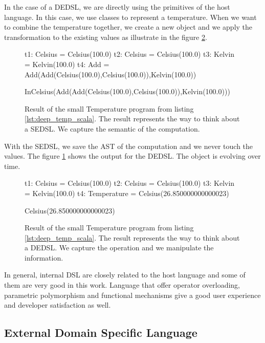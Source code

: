 In the case of a \gls{DEDSL}, we are directly using the primitives of the host
language. In this case, we use classes to represent a temperature. When we want
to combine the temperature together, we create a new object and we apply the
transformation to the existing values as illustrate in the figure \ref{fig:dsl_deep_result}.

\begin{figure}[ht]
  \centering
  \begin{scalacode}
t1: Celsius = Celsius(100.0)
t2: Celsius = Celsius(100.0)
t3: Kelvin = Kelvin(100.0)
t4: Add = Add(Add(Celsius(100.0),Celsius(100.0)),Kelvin(100.0))

InCelsius(Add(Add(Celsius(100.0),Celsius(100.0)),Kelvin(100.0)))
  \end{scalacode}
  \caption[Result of the \gls{SEDSL} for Temperature]{Result of the small
    Temperature program from listing \ref{lst:deep_temp_scala}. The result
    represents the way to think about a \gls{SEDSL}. We capture the semantic of
    the computation.}
  \label{fig:dsl_shallow_result}
\end{figure}

With the \gls{SEDSL}, we save the \gls{AST} of the computation and we never
touch the values. The figure \ref{fig:dsl_shallow_result} shows the output for
the \gls{DEDSL}. The object is evolving over time.

\begin{figure}[ht]
  \centering
  \begin{scalacode}
t1: Celsius = Celsius(100.0)
t2: Celsius = Celsius(100.0)
t3: Kelvin = Kelvin(100.0)
t4: Temperature = Celsius(26.850000000000023)

Celsius(26.850000000000023)
  \end{scalacode}
  \caption[Result of the \gls{DEDSL} for Temperature]{Result of the small
    Temperature program from listing \ref{lst:deep_temp_scala}. The result
    represents the way to think about a \gls{DEDSL}. We capture the operation and
  we manipulate the information.}
  \label{fig:dsl_deep_result}
\end{figure}

In general, internal \gls{DSL} are closely related to the host language and some
of them are very good in this work. Language that offer operator overloading,
parametric polymorphism and functional mechanisms give a good user experience
and developer satisfaction as well.

\subsection{External Domain Specific Language}
\label{sec:external_dsl}

